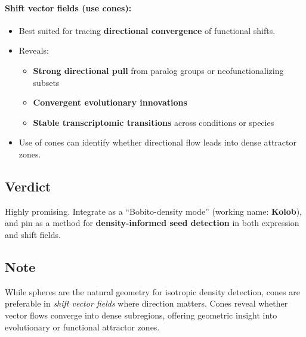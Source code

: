 \documentclass{article}
\begin{document}
\paragraph{Shift vector fields (use cones):}
\begin{itemize}
  \item Best suited for tracing \textbf{directional convergence} of functional shifts.
  \item Reveals:
    \begin{itemize}
      \item \textbf{Strong directional pull} from paralog groups or neofunctionalizing subsets
      \item \textbf{Convergent evolutionary innovations}
      \item \textbf{Stable transcriptomic transitions} across conditions or species
    \end{itemize}
  \item Use of cones can identify whether directional flow leads into dense attractor zones.
\end{itemize}

\subsection{Verdict}
Highly promising. Integrate as a ``Bobito-density mode'' (working name: \textbf{Kolob}), and pin as a method for \textbf{density-informed seed detection} in both expression and shift fields.

\subsection{Note}
While spheres are the natural geometry for isotropic density detection, cones are preferable in \emph{shift vector fields} where direction matters. Cones reveal whether vector flows converge into dense subregions, offering geometric insight into evolutionary or functional attractor zones.
\end{document}
